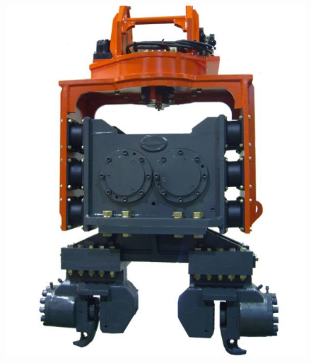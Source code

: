 \documentclass[10pt, pdf, hyperref={unicode}]{beamer}
\begin{document}
\begin{frame}
\begin{center}
\begin{minipage}[h]{0.97\linewidth}
\begin{minipage}[h]{0.22\linewidth}
\begin{figure}[h]
                        \includegraphics[width=1\linewidth]{../img/photo_1.jpg}
                    \end{figure}
                \end{minipage}
                \hfill
                \begin{minipage}[h]{0.22\linewidth}
                    \begin{figure}[h]
                        \centering

\end{figure}
\end{minipage}
\end{minipage}
\end{center}
\end{frame}
\end{document}
